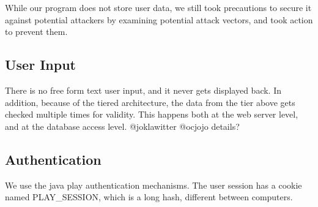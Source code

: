 
While our program does not store user data,
we still took precautions to secure it against potential attackers by examining 
potential attack vectors, and took action to prevent them.

\subsection{User Input}
There is no free form text user input, and it never gets displayed back.
In addition, because of the tiered architecture, the data from the tier above gets checked multiple times for validity.
This happens both at the web server level, and at the database access level.
@joklawitter @ocjojo details?

\subsection{Authentication}
We use the java play authentication mechanisms.
The user session has a cookie named PLAY_SESSION, which is a long hash, different between computers.


